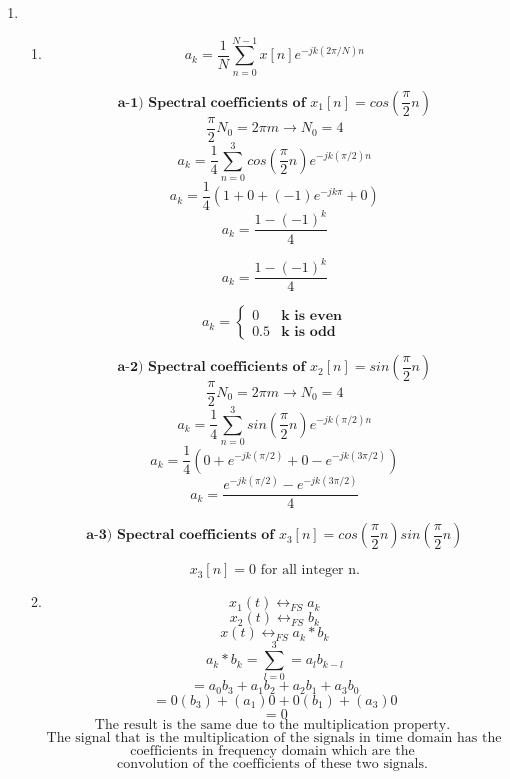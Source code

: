 \documentclass[10pt,a4paper, margin=1in]{article}
\begin{document}
\begin{enumerate}
\item %



    \begin{enumerate}


    
    
    \item %
    \[ a_k = \frac{1}{N}\sum_{n=0}^{N-1}x[n]e^{-jk(2\pi/N)n} \] 
    
    \[\textbf{a-1) Spectral coefficients of } x_1[n] = cos(\frac{\pi}{2}n)  \]
    \[\frac{\pi}{2}N_0 = 2\pi m \rightarrow N_0 = 4\]
    \[a_k = \frac{1}{4}\sum_{n=0}^{3}cos(\frac{\pi}{2}n)e^{-jk(\pi/2)n} \]
    \[a_k = \frac{1}{4}(1 + 0 + (-1)e^{-jk\pi} + 0 )\]
    \[a_k = \frac{1 - (-1)^k}{4} \]


    \[a_k = \frac{1 - (-1)^k}{4} \]

    \[ a_k = \begin{cases} 
        0 & \textbf{k is even} \\
        0.5 & \textbf{k is odd}
        \end{cases}
    \]

    \[\textbf{a-2) Spectral coefficients of } x_2[n] = sin(\frac{\pi}{2}n)  \]
    \[\frac{\pi}{2}N_0 = 2\pi m \rightarrow N_0 = 4\]
    \[a_k = \frac{1}{4}\sum_{n=0}^{3}sin(\frac{\pi}{2}n)e^{-jk(\pi/2)n} \]
    \[a_k = \frac{1}{4}(0 + e^{-jk(\pi/2)} + 0 - e^{-jk(3\pi/2)} )\]
    \[a_k = \frac{ e^{-jk(\pi/2)} - e^{-jk(3\pi/2)} }{4} \]

    \[\textbf{a-3) Spectral coefficients of } x_3[n] = cos(\frac{\pi}{2}n)sin(\frac{\pi}{2}n)  \]

    \[ x_3[n] = 0 \text{   for all integer n.} \]
    
    
    \item %
    \[x_1(t)  \longleftrightarrow_{FS} a_k\]
    \[x_2(t)  \longleftrightarrow_{FS} b_k\]
    \[x(t)  \longleftrightarrow_{FS} a_k \ast b_k\]
    \[ a_k \ast b_k = \sum_{l=0}^3 = a_l b_{k-l}\]
    \[ = a_0b_3 + a_1b_2 + a_2b_1 + a_3b_0 \]
    \[ = 0(b_3) + (a_1)0 + 0(b_1) + (a_3)0 \]
    \[ = 0 \]
    \[ \text{The result is the same due to the multiplication property.  } \]
    \[ \text{The signal that is the multiplication of the signals in time domain has the } \]
    \[ \text{coefficients in frequency domain which are the  } \]
    \[ \text{convolution of the coefficients of these two signals.  } \]
    
    \end{enumerate}


\end{enumerate}
\end{document}
